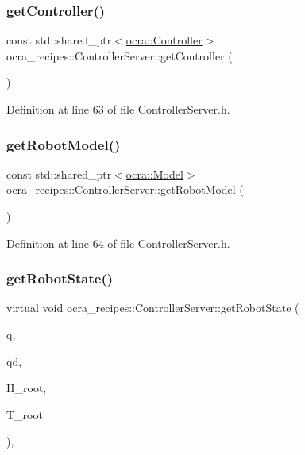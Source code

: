 \subsubsection{\texorpdfstring{get\+Controller()}{getController()}}
{\footnotesize\ttfamily const std\+::shared\+\_\+ptr$<$\hyperlink{classocra_1_1Controller}{ocra\+::\+Controller}$>$ ocra\+\_\+recipes\+::\+Controller\+Server\+::get\+Controller (\begin{DoxyParamCaption}{ }\end{DoxyParamCaption})\hspace{0.3cm}{\ttfamily [inline]}}



Definition at line 63 of file Controller\+Server.\+h.

\hypertarget{classocra__recipes_1_1ControllerServer_ab83e5cc59e33d26cedbea43afae25e1e}{}\label{classocra__recipes_1_1ControllerServer_ab83e5cc59e33d26cedbea43afae25e1e} 
\subsubsection{\texorpdfstring{get\+Robot\+Model()}{getRobotModel()}}
{\footnotesize\ttfamily const std\+::shared\+\_\+ptr$<$\hyperlink{classocra_1_1Model}{ocra\+::\+Model}$>$ ocra\+\_\+recipes\+::\+Controller\+Server\+::get\+Robot\+Model (\begin{DoxyParamCaption}{ }\end{DoxyParamCaption})\hspace{0.3cm}{\ttfamily [inline]}}



Definition at line 64 of file Controller\+Server.\+h.

\hypertarget{classocra__recipes_1_1ControllerServer_a93ec150bea9b2a7a03aac1cc048d5484}{}\label{classocra__recipes_1_1ControllerServer_a93ec150bea9b2a7a03aac1cc048d5484} 
\subsubsection{\texorpdfstring{get\+Robot\+State()}{getRobotState()}}
{\footnotesize\ttfamily virtual void ocra\+\_\+recipes\+::\+Controller\+Server\+::get\+Robot\+State (\begin{DoxyParamCaption}\item[{Eigen\+::\+Vector\+Xd \&}]{q,  }\item[{Eigen\+::\+Vector\+Xd \&}]{qd,  }\item[{Eigen\+::\+Displacementd \&}]{H\+\_\+root,  }\item[{Eigen\+::\+Twistd \&}]{T\+\_\+root }\end{DoxyParamCaption})\hspace{0.3cm}{\ttfamily [protected]}, {}}

